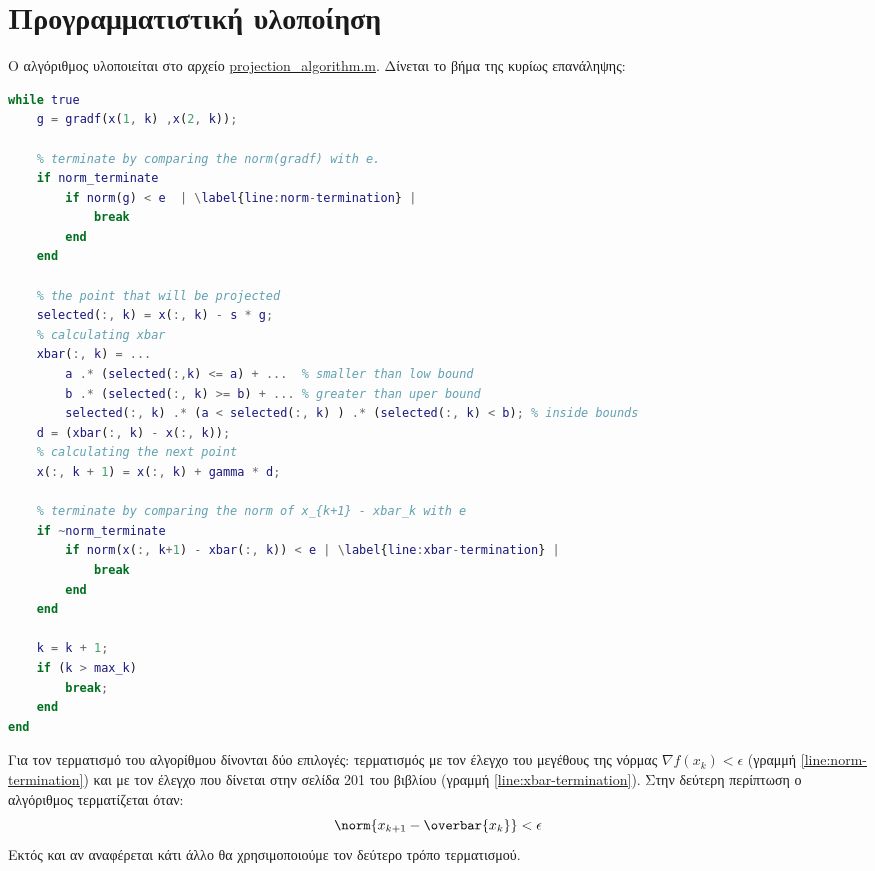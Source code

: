 \section{Προγραμματιστική υλοποίηση}

Ο αλγόριθμος υλοποιείται στο αρχείο \hyperref{steepest/projection_algorithm.m}{categoryname}{labelname}{projection\_algorithm.m}. Δίνεται το βήμα της κυρίως επανάληψης:


\begin{lstlisting}[language=Matlab, escapechar=|, caption=Κυρίως βήμα στην υλοποίηση της μεθόδου μεγίστης καθόδου με προβολή]
% main loop
while true
    g = gradf(x(1, k) ,x(2, k));
    
    % terminate by comparing the norm(gradf) with e.
    if norm_terminate
        if norm(g) < e	| \label{line:norm-termination} |
            break
        end
    end
    
    % the point that will be projected
    selected(:, k) = x(:, k) - s * g;
    % calculating xbar
    xbar(:, k) = ...
        a .* (selected(:,k) <= a) + ...  % smaller than low bound
        b .* (selected(:, k) >= b) + ... % greater than uper bound
        selected(:, k) .* (a < selected(:, k) ) .* (selected(:, k) < b); % inside bounds
    d = (xbar(:, k) - x(:, k));
    % calculating the next point
    x(:, k + 1) = x(:, k) + gamma * d;
    
    % terminate by comparing the norm of x_{k+1} - xbar_k with e
    if ~norm_terminate
        if norm(x(:, k+1) - xbar(:, k)) < e | \label{line:xbar-termination} |
            break
        end
    end    
    
    k = k + 1;
    if (k > max_k) 
        break; 
    end
end
\end{lstlisting}

Για τον τερματισμό του αλγορίθμου δίνονται δύο επιλογές: τερματισμός με τον έλεγχο του μεγέθους της νόρμας $\nabla f(x_k) < \epsilon$ (γραμμή \ref{line:norm-termination}) και με τον έλεγχο που δίνεται στην σελίδα 201 του βιβλίου (γραμμή \ref{line:xbar-termination}). Στην δεύτερη περίπτωση ο αλγόριθμος τερματίζεται όταν:
\begin{equation}
\label{eq:termination-condition}
\norm{x_{k+1} - \overbar{x_k}} < \epsilon
\end{equation}
Εκτός και αν αναφέρεται κάτι άλλο θα χρησιμοποιούμε τον δεύτερο τρόπο τερματισμού.
